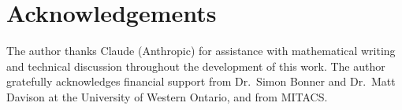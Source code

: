 \documentclass[11pt]{article}
\theoremstyle{definition}
\begin{document}



\section*{Acknowledgements}

The author thanks Claude (Anthropic) for assistance with mathematical
writing and technical discussion throughout the development of this
work.  The author gratefully acknowledges financial support from
Dr.\ Simon Bonner and Dr.\ Matt Davison at the University of Western
Ontario, and from MITACS.
\end{document}
